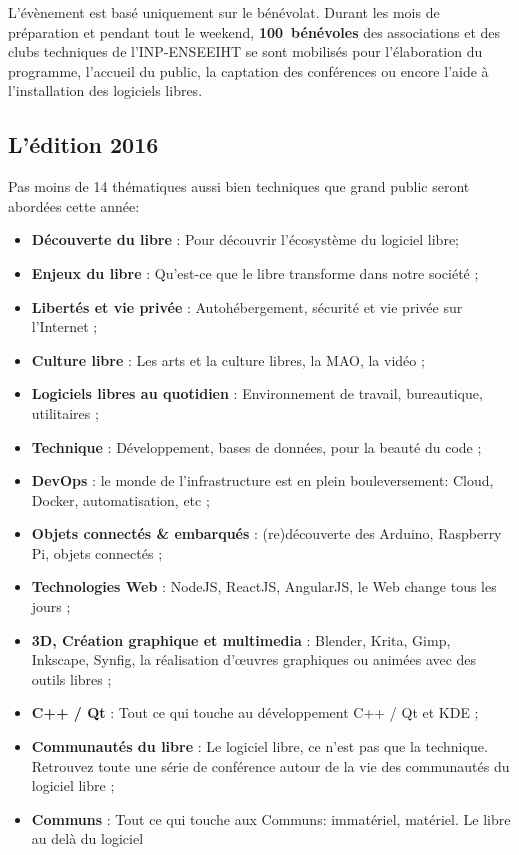 \Separateur

L’évènement est basé uniquement sur le bénévolat.
 Durant les mois de préparation et pendant tout le weekend,
 \textbf{100~bénévoles} des associations et des clubs techniques
 de l’INP-ENSEEIHT se sont mobilisés pour l’élaboration du programme,
 l’accueil du public, la captation des conférences ou encore l’aide
 à l’installation des logiciels libres.


\subsection{L'édition 2016}

Pas moins de 14 thématiques aussi bien techniques que grand public seront abordées cette année:

\begin{itemize}[label=$\bullet$]
\item \textbf{Découverte du libre} : Pour découvrir l'écosystème du logiciel libre;
\item \textbf{Enjeux du libre} : Qu'est-ce que le libre transforme dans notre société ;
\item \textbf{Libertés et vie privée} : Autohébergement, sécurité et vie privée sur l’Internet ;
\item \textbf{Culture libre} : Les arts et la culture libres, la MAO, la vidéo ;
\item \textbf{Logiciels libres au quotidien} : Environnement de travail, bureautique, utilitaires ;
\item \textbf{Technique} : Développement, bases de données, pour la beauté du code ;
\item \textbf{DevOps} : le monde de l'infrastructure est en plein bouleversement: Cloud, Docker, automatisation, etc ;
\item \textbf{Objets connectés \& embarqués} : (re)découverte des Arduino, Raspberry Pi, objets connectés ;
\item \textbf{Technologies Web} : NodeJS, ReactJS, AngularJS, le Web change tous les jours ;
\item \textbf{3D, Création graphique et multimedia} : Blender, Krita, Gimp, Inkscape, Synfig, la réalisation d’œuvres graphiques ou animées avec des outils libres ;
\item \textbf{C++ / Qt} : Tout ce qui touche au développement C++ / Qt et KDE ;
\item \textbf{Communautés du libre} : Le logiciel libre, ce n'est pas que la technique. Retrouvez toute une série de conférence autour de la vie des communautés du logiciel libre ;
\item \textbf{Communs} : Tout ce qui touche aux Communs: immatériel, matériel. Le libre au delà du logiciel
\end{itemize}

